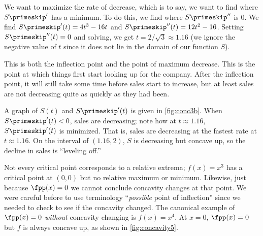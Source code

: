 {We want to maximize the rate of decrease, which is to say, we want to find where $S\primeskip'$ has a minimum.  To do this, we find where $S\primeskip''$ is 0.  We find $S\primeskip'(t)=4t^3-16t$ and $S\primeskip''(t)=12t^2-16$.  Setting $S\primeskip''(t)=0$ and solving, we get $t=2/\sqrt3\approx 1.16$ (we ignore the negative value of $t$ since it does not lie in the domain of our function $S$).


\begin{center}
\end{center}

This is both the inflection point and the point of maximum decrease.  This is the point at which things first start looking up for the company.  After the inflection point, it will still take some time before sales start to increase, but at least sales are not decreasing quite as quickly as they had been.

A graph of $S(t)$ and $S\primeskip'(t)$ is given in \autoref{fig:conc3b}. When $S\primeskip'(t)<0$, sales are decreasing; note how at $t\approx 1.16$, $S\primeskip'(t)$ is minimized. That is, sales are decreasing at the fastest rate at $t\approx 1.16$.  On the interval of $(1.16,2)$, $S$ is decreasing but concave up, so the decline in sales is ``leveling off.''}

Not every critical point corresponds to a relative extrema; $f(x)=x^3$ has a critical point at $(0,0)$ but no relative maximum or minimum. Likewise, just because $\fpp(x)=0$ we cannot conclude concavity changes at that point. We were careful before to use terminology ``\textit{possible} point of inflection'' since we needed to check to see if the concavity changed. The canonical example of $\fpp(x)=0$ \textit{without} concavity changing is $f(x)=x^4$. At $x=0$, $\fpp(x)=0$ but $f$ is always concave up, as shown in \autoref{fig:concavity5}.

